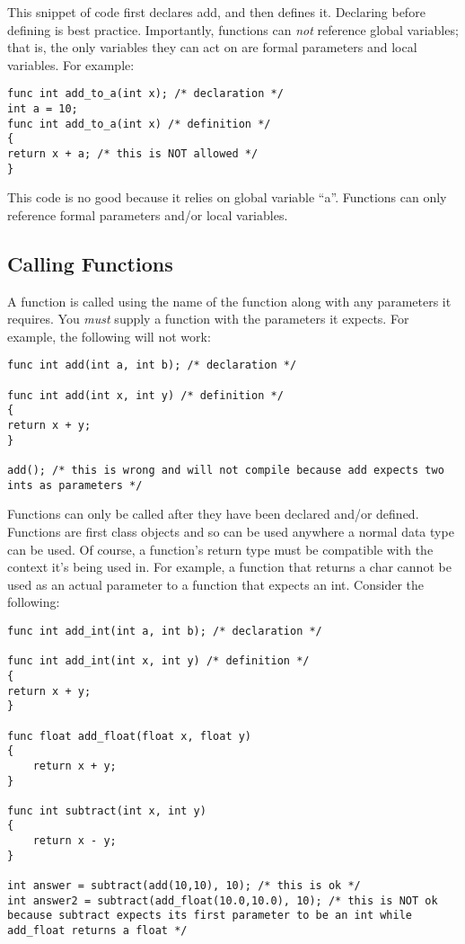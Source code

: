 \documentclass{article}
\begin{document}
This snippet of code first declares add, and then defines it. Declaring before defining is best practice. Importantly, functions can \emph{not} reference global variables; that is, the only variables they can act on are formal parameters and local variables. For example:

\begin{lstlisting}
func int add_to_a(int x); /* declaration */
int a = 10;
func int add_to_a(int x) /* definition */
{
return x + a; /* this is NOT allowed */
}
\end{lstlisting}

This code is no good because it relies on global variable ``a''. Functions can only reference formal parameters and/or local variables.

\subsection{Calling Functions}

A function is called using the name of the function along with any parameters it requires. You \emph{must} supply a function with the parameters it expects. For example, the following will not work:

\begin{lstlisting}
func int add(int a, int b); /* declaration */

func int add(int x, int y) /* definition */
{
return x + y;
}

add(); /* this is wrong and will not compile because add expects two ints as parameters */

\end{lstlisting}

Functions can only be called after they have been declared and/or defined. Functions are first class objects and so can be used anywhere a normal data type can be used. Of course, a function's return type must be compatible with the context it's being used in. For example, a function that returns a char cannot be used as an actual parameter to a function that expects an int.  Consider the following:

\begin{lstlisting}
func int add_int(int a, int b); /* declaration */

func int add_int(int x, int y) /* definition */
{
return x + y;
}

func float add_float(float x, float y)
{
	return x + y;
}

func int subtract(int x, int y)
{
	return x - y;
}

int answer = subtract(add(10,10), 10); /* this is ok */
int answer2 = subtract(add_float(10.0,10.0), 10); /* this is NOT ok because subtract expects its first parameter to be an int while add_float returns a float */

\end{lstlisting}
\end{document}
